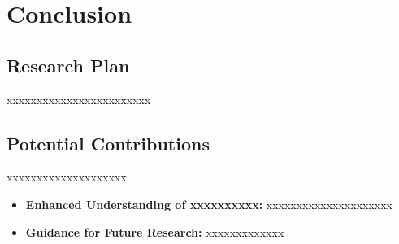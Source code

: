 \chapter{Conclusion}
\section{Research Plan}

xxxxxxxxxxxxxxxxxxxxxxxx


\section{Potential Contributions}
xxxxxxxxxxxxxxxxxxxx

\begin{itemize}
    \item \textbf{Enhanced Understanding of xxxxxxxxxx:} xxxxxxxxxxxxxxxxxxxxx

    \item \textbf{Guidance for Future Research:} xxxxxxxxxxxxx
\end{itemize}

